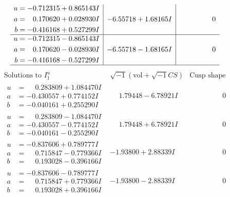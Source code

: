 \documentclass[1p]{elsarticle_modified}
\theoremstyle{definition}
\newcommand{\I}{\sqrt{-1}}
\begin{document}
$$\begin{array}{c|c|c}
\begin{aligned}
u &= -0.712315 + 0.865143 I \\
a &= \phantom{-}0.170620 + 0.028930 I \\
b &= -0.416168 + 0.527299 I\end{aligned}
 & -6.55718 + 1.68165 I & \phantom{-0.000000 } 0 \\ \hline\begin{aligned}
u &= -0.712315 - 0.865143 I \\
a &= \phantom{-}0.170620 - 0.028930 I \\
b &= -0.416168 - 0.527299 I\end{aligned}
 & -6.55718 - 1.68165 I & \phantom{-0.000000 } 0\\
 \hline 
 \end{array}$$\newpage$$\begin{array}{c|c|c}  
\text{Solutions to }I^u_{1}& \I (\text{vol} + \sqrt{-1}CS) & \text{Cusp shape}\\
 \hline 
\begin{aligned}
u &= \phantom{-}0.283809 + 1.084470 I \\
a &= -0.430557 + 0.774152 I \\
b &= -0.040161 + 0.255290 I\end{aligned}
 & \phantom{-}1.79448 - 6.78921 I & \phantom{-0.000000 } 0 \\ \hline\begin{aligned}
u &= \phantom{-}0.283809 - 1.084470 I \\
a &= -0.430557 - 0.774152 I \\
b &= -0.040161 - 0.255290 I\end{aligned}
 & \phantom{-}1.79448 + 6.78921 I & \phantom{-0.000000 } 0 \\ \hline\begin{aligned}
u &= -0.837606 + 0.789777 I \\
a &= \phantom{-}0.715847 - 0.779366 I \\
b &= \phantom{-}0.193028 - 0.396166 I\end{aligned}
 & -1.93800 + 2.88339 I & \phantom{-0.000000 } 0 \\ \hline\begin{aligned}
u &= -0.837606 - 0.789777 I \\
a &= \phantom{-}0.715847 + 0.779366 I \\
b &= \phantom{-}0.193028 + 0.396166 I\end{aligned}
 & -1.93800 - 2.88339 I & \phantom{-0.000000 } 0 \\ \hline\begin{aligned}

\end{aligned}
\end{array}$$
\end{document}
